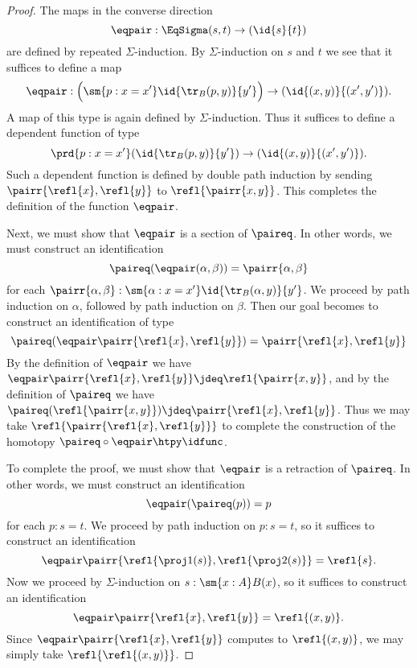 \begin{proof}
The maps in the converse direction
\begin{equation*}
\eqpair : \EqSigma(s,t)\to(\id{s}{t})
\end{equation*}
are defined by repeated $\Sigma$-induction. By $\Sigma$-induction on $s$ and $t$  we see that it suffices to define a map
\begin{equation*}
\eqpair : \Big(\sm{p:x=x'}\id{\tr_B(p,y)}{y'}\Big)\to(\id{(x,y)}{(x',y')}).
\end{equation*}
A map of this type is again defined by $\Sigma$-induction. Thus it suffices to define a dependent function of type
\begin{equation*}
\prd{p:x=x'} (\id{\tr_B(p,y)}{y'}) \to (\id{(x,y)}{(x',y')}).
\end{equation*}
Such a dependent function is defined by double path induction by sending $\pairr{\refl{x},\refl{y}}$ to $\refl{\pairr{x,y}}$. This completes the definition of the function $\eqpair$.

Next, we must show that $\eqpair$ is a section of $\paireq$. In other words, we must construct an identification
\begin{equation*}
\paireq(\eqpair(\alpha,\beta))=\pairr{\alpha,\beta}
\end{equation*}
for each $\pairr{\alpha,\beta}:\sm{\alpha:x=x'}\id{\tr_B(\alpha,y)}{y'}$. We proceed by path induction on $\alpha$, followed by path induction on $\beta$. Then our goal becomes to construct an identification of type
\begin{equation*}
\paireq(\eqpair\pairr{\refl{x},\refl{y}})=\pairr{\refl{x},\refl{y}}
\end{equation*}
By the definition of $\eqpair$ we have $\eqpair\pairr{\refl{x},\refl{y}}\jdeq \refl{\pairr{x,y}}$, and by the definition of $\paireq$ we have $\paireq(\refl{\pairr{x,y}})\jdeq\pairr{\refl{x},\refl{y}}$. Thus we may take $\refl{\pairr{\refl{x},\refl{y}}}$ to complete the construction of the homotopy $\paireq\circ\eqpair\htpy\idfunc$.

To complete the proof, we must show that $\eqpair$ is a retraction of $\paireq$. In other words, we must construct an identification
\begin{equation*}
\eqpair(\paireq(p))=p
\end{equation*}
for each $p:s=t$. We proceed by path induction on $p:s=t$, so it suffices to construct an identification 
\begin{equation*}
\eqpair\pairr{\refl{\proj 1(s)},\refl{\proj 2(s)}}=\refl{s}.
\end{equation*}
Now we proceed by $\Sigma$-induction on $s:\sm{x:A}B(x)$, so it suffices to construct an identification
\begin{equation*}
\eqpair\pairr{\refl{x},\refl{y}}=\refl{(x,y)}.
\end{equation*}
Since $\eqpair\pairr{\refl{x},\refl{y}}$ computes to $\refl{(x,y)}$, we may simply take $\refl{\refl{(x,y)}}$.
\end{proof}

